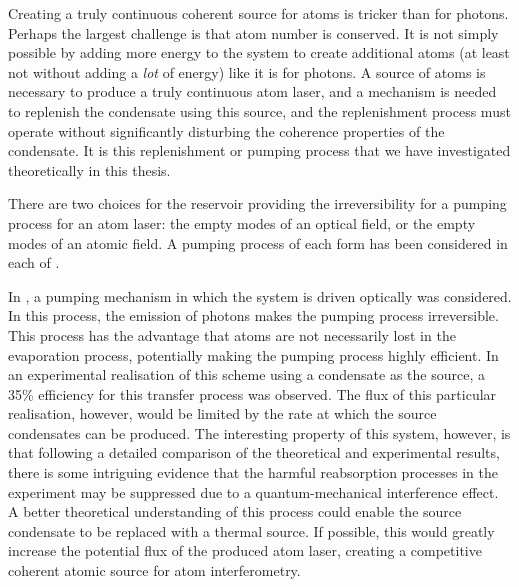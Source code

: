 Creating a truly continuous coherent source for atoms is tricker than for photons.  Perhaps the largest challenge is that atom number is conserved.  It is not simply possible by adding more energy to the system to create additional atoms (at least not without adding a \emph{lot} of energy) like it is for photons.  A source of atoms is necessary to produce a truly continuous atom laser, and a mechanism is needed to replenish the condensate using this source, and the replenishment process must operate without significantly disturbing the coherence properties of the condensate.  It is this replenishment or pumping process that we have investigated theoretically in this thesis.

There are two choices for the reservoir providing the irreversibility for a pumping process for an atom laser: the empty modes of an optical field, or the empty modes of an atomic field.  A pumping process of each form has been considered in each of .

In , a pumping mechanism in which the system is driven optically was considered.  In this process, the emission of photons makes the pumping process irreversible.  This process has the advantage that atoms are not necessarily lost in the evaporation process, potentially making the pumping process highly efficient.  In an experimental realisation of this scheme using a condensate as the source, a 35\% efficiency for this transfer process was observed.  The flux of this particular realisation, however, would be limited by the rate at which the source condensates can be produced.  The interesting property of this system, however, is that following a detailed comparison of the theoretical and experimental results, there is some intriguing evidence that the harmful reabsorption processes in the experiment may be suppressed due to a quantum-mechanical interference effect.  A better theoretical understanding of this process could enable the source condensate to be replaced with a thermal source.  If possible, this would greatly increase the potential flux of the produced atom laser, creating a competitive coherent atomic source for atom interferometry.


